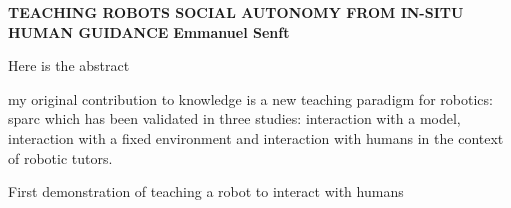 \textbf{TEACHING ROBOTS SOCIAL AUTONOMY FROM IN-SITU HUMAN GUIDANCE}\newline
\textbf{Emmanuel Senft}

Here is the abstract

my original contribution to knowledge is a new teaching paradigm for robotics: \gls{sparc} which has been validated in three studies: interaction with a model, interaction with a fixed environment and interaction with humans in the context of robotic tutors.

First demonstration of teaching a robot to interact with humans